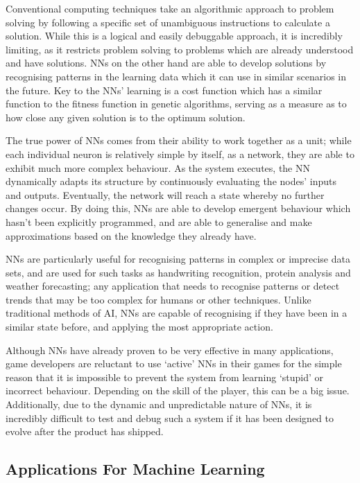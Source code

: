 \documentclass[a4paper,oneside]{report}
\begin{document}
Conventional computing techniques take an algorithmic approach to problem solving by following a specific set of unambiguous instructions to calculate a solution. While this is a logical and easily debuggable approach, it is incredibly limiting, as it restricts problem solving to problems which are already understood and have solutions. NNs on the other hand are able to develop solutions by recognising patterns in the learning data which it can use in similar scenarios in the future. Key to the NNs' learning is a cost function which has a similar function to the fitness function in genetic algorithms, serving as a measure as to how close any given solution is to the optimum solution.

The true power of NNs comes from their ability to work together as a unit; while each individual neuron is relatively simple by itself, as a network, they are able to exhibit much more complex behaviour. As the system executes, the NN dynamically adapts its structure by continuously evaluating the nodes' inputs and outputs. Eventually, the network will reach a state whereby no further changes occur. By doing this, NNs are able to develop emergent behaviour which hasn't been explicitly programmed, and are able to generalise and make approximations based on the knowledge they already have.

NNs are particularly useful for recognising patterns in complex or imprecise data sets, and are used for such tasks as handwriting recognition, protein analysis and weather forecasting; any application that needs to recognise patterns or detect trends that may be too complex for humans or other techniques. Unlike traditional methods of AI, NNs are capable of recognising if they have been in a similar state before, and applying the most appropriate action.

Although NNs have already proven to be very effective in many applications, game developers are reluctant to use `active' NNs in their games for the simple reason that it is impossible to prevent the system from learning `stupid' or incorrect behaviour. Depending on the skill of the player, this can be a big issue. Additionally, due to the dynamic and unpredictable nature of NNs, it is incredibly difficult to test and debug such a system if it has been designed to evolve after the product has shipped.

\subsection{Applications For Machine Learning}
\end{document}
